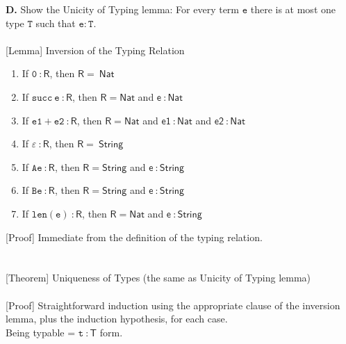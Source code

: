 \documentclass[a4paper]{article}
\begin{document}
\textbf{D.} Show the Unicity of Typing lemma: For every term
$\mathtt e$ there is at most one type $\mathtt T$ such that $\mathtt e : \mathtt
T$.\\\\
{[Lemma]} Inversion of the Typing Relation
\begin{enumerate}
  \item If $\mathtt 0 ~\mathsf {: R}$, then $\mathsf R = ~\mathsf {Nat}$
  \item If $\mathtt {succ \ e}~\mathsf{: R}$, then $\mathsf R = \mathsf {Nat}$ and $\mathsf {e} ~\mathsf {: Nat}$
  \item If $\mathtt {e1 + e2}~\mathsf{: R}$, then $\mathsf R = \mathsf {Nat}$ and $\mathsf {e1} ~\mathsf {: Nat}$ and $\mathsf {e2} ~\mathsf {: Nat}$
  \item If $\mathtt \varepsilon ~\mathsf {: R}$, then $\mathsf R = ~\mathsf {String}$
  \item If $\mathtt {Ae}~\mathsf{: R}$, then $\mathsf R = \mathsf {String}$ and $\mathsf {e} ~\mathsf {: String}$
  \item If $\mathtt {Be}~\mathsf{: R}$, then $\mathsf R = \mathsf {String}$ and $\mathsf {e} ~\mathsf {: String}$
  \item If $\mathtt {len(e)}~\mathsf{: R}$, then $\mathsf R = \mathsf {Nat}$ and $\mathsf {e} ~\mathsf {: String}$
\end{enumerate}
{[Proof]} Immediate from the definition of the typing relation.\\\\\\
{[Theorem]} Uniqueness of Types (the same as Unicity of Typing lemma)\\\\
  {[Proof]} Straightforward induction using the appropriate clause of the inversion lemma, plus the induction hypothesis, for each case.\\
  Being typable = $\mathtt t ~\mathsf{ : T}$ form.
\end{document}
